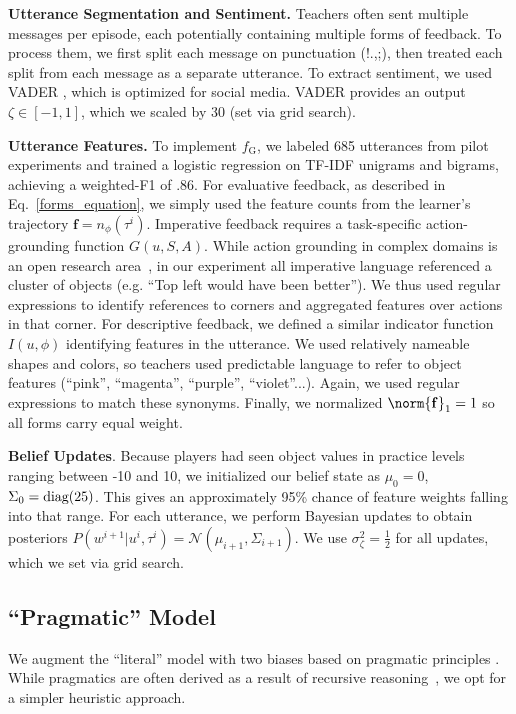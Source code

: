 \documentclass[letterpaper]{article} %
\begin{document}
\textbf{Utterance Segmentation and Sentiment.} Teachers often sent multiple messages per episode, each potentially containing multiple forms of feedback. To process them, we first split each message on punctuation (!.,;), then treated each split from each message as a separate utterance. To extract sentiment, we used VADER \citep{HuttoG14}, which is optimized for social media. VADER provides an output $\zeta \in [-1,1]$, which we scaled by 30 (set via grid search). 

\textbf{Utterance Features.} To implement $f_\text{G}$, we labeled 685 utterances from pilot experiments and trained a logistic regression on TF-IDF unigrams and bigrams, achieving a weighted-F1 of .86. For evaluative feedback, as described in Eq.~\ref{forms_equation}, we simply used the feature counts from the learner's trajectory $\mathbf{f} = n_\phi(\tau^i)$. Imperative feedback requires a task-specific action-grounding function $G(u,S,A)$. While action grounding in complex domains is an open research area~\citep{Tellex2020}, in our experiment all imperative language referenced a cluster of objects (e.g. ``Top left would have been better''). We thus used regular expressions to identify references to corners and aggregated features over actions in that corner. For descriptive feedback, we defined a similar indicator function $I(u, \phi)$ identifying features in the utterance. We used relatively nameable shapes and colors, so teachers used predictable language to refer to object features (``pink'', ``magenta'', ``purple'', ``violet''...). Again, we used regular expressions to match these synonyms. Finally, we normalized $\norm{\mathbf{f}}_1 = 1$ so all forms carry equal weight. 

\textbf{Belief Updates}. Because players had seen object values in practice levels ranging between -10 and 10, we initialized our belief state as $\mu_0 = 0$, $\Sigma_0 = \mbox{\rm diag}(25)$. This gives an approximately 95\% chance of feature weights falling into that range. For each utterance, we perform Bayesian updates to obtain posteriors $P(w^{i+1} | u^i, \tau^i) = \mathcal{N}(\mu_{i+1},\Sigma_{i+1})$. We use $\sigma_\zeta^2 = \frac{1}{2}$ for all updates, which we set via grid search.

\subsection{``Pragmatic'' Model}
\label{pragmatic_model_desc}
We augment the ``literal'' model with two biases based on pragmatic principles \cite{grice1975logic}. While pragmatics are often derived as a result of recursive reasoning~\cite{goodman_2016}, we opt for a simpler heuristic approach.
\end{document}
